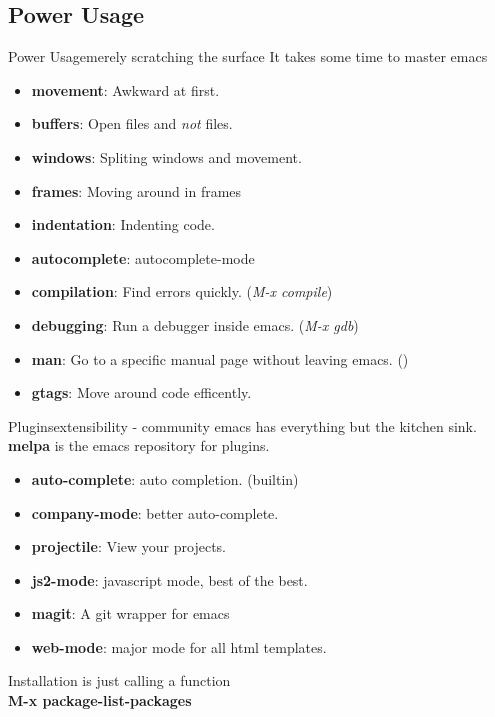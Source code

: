 \documentclass{beamer}
\begin{document}
\subsection{Power Usage}
\begin{frame}{Power Usage}{merely scratching the surface}
	It takes some time to master emacs \pause
	\begin{itemize}
			\item {
					\textbf{movement}: Awkward at first.
					\pause
					}
			\item {
					\textbf{buffers}: Open files and \textit{not} files.
					\pause
					}
			\item {
					\textbf{windows}: Spliting windows and movement.
					\pause
					}
			\item {
					\textbf{frames}: Moving around in frames
					\pause
					}
			\item {
					\textbf{indentation}: Indenting code.
					\pause
					}
			\item {
					\textbf{autocomplete}: autocomplete-mode
					\pause
					}
			\item {
					\textbf{compilation}: Find errors quickly. (\textit{M-x compile})
					\pause
					}
			\item {
					\textbf{debugging}: Run a debugger inside emacs. (\textit{M-x gdb})
					\pause
					}
			\item {
					\textbf{man}: Go to a specific manual page without leaving emacs. ()
					\pause
					}
			\item {
					\textbf{gtags}: Move around code efficently.
					\pause
					}

	\end{itemize}
\end{frame}
\begin{frame}{Plugins}{extensibility - community}
	emacs has everything but the kitchen sink.\\ \pause
	\textbf{melpa} is the emacs repository for plugins.\\
	\begin{itemize}
		\item {
				\textbf{auto-complete}: auto completion. (builtin)
				\pause
				}
		\item {
				\textbf{company-mode}: better auto-complete.
				\pause
				}
		\item {
				\textbf{projectile}: View your projects.
				\pause
				}
		\item {
				\textbf{js2-mode}: javascript mode, best of the best.
				\pause
				}
		\item {
				\textbf{magit}: A git wrapper for emacs
				\pause
				}
		\item{
				\textbf{web-mode}: major mode for all html templates.
				\pause
				}
	\end{itemize}
	Installation is just calling a function \\
	\textbf{M-x package-list-packages}\\
\end{frame}
\end{document}

